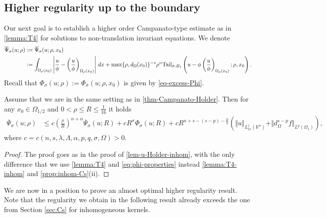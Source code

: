 \documentclass[11pt,reqno]{amsart}
\theoremstyle{plain}
\theoremstyle{definition}
\numberwithin{equation}{section}
\newcommand{\R}{\mathbb{R}}
\newcommand{\1}{\mathbbm{1}}
\renewcommand{\d}{\textnormal{\,d}}
\begin{document}
\subsection{Higher regularity up to the boundary}



Our next goal is to establish a higher order Campanato-type estimate as in \autoref{lemma:T4} for solutions to non-translation invariant equations. We denote
\begin{align*}
\overline{\Psi}_{\sigma}(u;\rho) 
&:= \overline{\Psi}_{\sigma}(u;\rho,x_0) \\
&:= \int_{\Omega_{\rho}(x_0)} \left|\frac{u}{\phi} - \left( \frac{u}{\phi} \right)_{\Omega_{\rho}(x_0)} \right| \d x + \max\{\rho,d_{\Omega}(x_0)\}^{-s} \rho^n \mathrm{Tail}_{\sigma,B_1}\left(u - \phi\left(\frac{u}{\phi}\right)_{\Omega_{\rho}(x_0)}; \rho, x_0 \right).
\end{align*}
Recall that $\Phi_{\sigma}(u; \rho):=\Phi_{\sigma}(u; \rho, x_0)$ is given by \eqref{eq-excess-Phi}.

\begin{lemma}\label{lem-u-Holder}
Assume that we are in the same setting as in \autoref{thm-Campanato-Holder}. Then for any $x_0 \in \Omega_{1/2}$ and $0 < \rho \leq R \leq \frac{1}{16}$ it holds
\begin{align*}
\overline{\Psi}_\sigma(u;\rho)
&\leq c \left( \frac{\rho}{R} \right)^{n+\alpha} \overline{\Psi}_\sigma(u; R) + cR^{\sigma} \Phi_{\sigma}(u; R) + c R^{n + s -(s-p) - \frac{n}{q}} \left(\Vert u \Vert_{L^1_{2s}(\R^n)} + \Vert d_{\Omega}^{s-p} f \Vert_{L^q(\Omega_1)} \right),
\end{align*}
where $c=c(n, s, \lambda, \Lambda, \alpha, p, q, \sigma, \Omega) > 0$.
\end{lemma}

\begin{proof}
    The proof goes as in the proof of \autoref{lem-u-Holder-inhom}, with the only difference that we use \autoref{lemma:T4} and \eqref{eq:phi-properties} instead \autoref{lemma:T4-inhom} and \autoref{prop:inhom-Cs}(ii).
\end{proof}


We are now in a position to prove an almost optimal higher regularity result. Note that the regularity we obtain in the following result already exceeds the one from Section \ref{sec:Cs} for inhomogeneous kernels.
\end{document}
